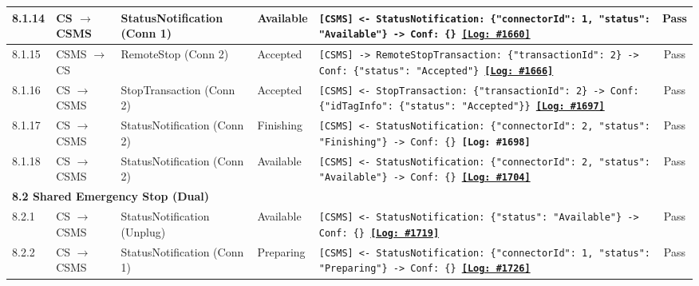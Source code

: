 \documentclass[10pt, a4paper, landscape]{article}
\begin{document}
\begin{longtable}{|p{1.0cm}|p{2.5cm}|p{4.0cm}|p{5.0cm}|p{10.0cm}|c|}
\hline
8.1.14 & CS $\to$ CSMS & StatusNotification (Conn 1) & Available & \footnotesize\texttt{[CSMS] <- StatusNotification: \{"connectorId": 1, "status": "Available"\} \newline [CSMS] -> Conf: \{\} \newline \hyperref[log:8.1.14]{\textbf{[Log: \#1660]}}} & Pass \\
\hline
8.1.15 & CSMS $\to$ CS & RemoteStop (Conn 2) & Accepted & \footnotesize\texttt{[CSMS] -> RemoteStopTransaction: \{"transactionId": 2\} \newline [CS] -> Conf: \{"status": "Accepted"\} \newline \hyperref[log:8.1.15]{\textbf{[Log: \#1666]}}} & Pass \\
\hline
8.1.16 & CS $\to$ CSMS & StopTransaction (Conn 2) & Accepted & \footnotesize\texttt{[CSMS] <- StopTransaction: \{"transactionId": 2\} \newline [CSMS] -> Conf: \{"idTagInfo": \{"status": "Accepted"\}\} \newline \hyperref[log:8.1.16]{\textbf{[Log: \#1697]}}} & Pass \\
\hline
8.1.17 & CS $\to$ CSMS & StatusNotification (Conn 2) & Finishing & \footnotesize\texttt{[CSMS] <- StatusNotification: \{"connectorId": 2, "status": "Finishing"\} \newline [CSMS] -> Conf: \{\} \newline \textbf{[Log: \#1698]}} & Pass \\
\hline
8.1.18 & CS $\to$ CSMS & StatusNotification (Conn 2) & Available & \footnotesize\texttt{[CSMS] <- StatusNotification: \{"connectorId": 2, "status": "Available"\} \newline [CSMS] -> Conf: \{\} \newline \hyperref[log:8.1.18]{\textbf{[Log: \#1704]}}} & Pass \\
\hline
\multicolumn{6}{|l|}{\textbf{8.2 Shared Emergency Stop (Dual)}} \\
\hline
8.2.1 & CS $\to$ CSMS & StatusNotification (Unplug) & Available & \footnotesize\texttt{[CSMS] <- StatusNotification: \{"status": "Available"\} \newline [CSMS] -> Conf: \{\} \newline \hyperref[log:8.2.1]{\textbf{[Log: \#1719]}}} & Pass \\
\hline
8.2.2 & CS $\to$ CSMS & StatusNotification (Conn 1) & Preparing & \footnotesize\texttt{[CSMS] <- StatusNotification: \{"connectorId": 1, "status": "Preparing"\} \newline [CSMS] -> Conf: \{\} \newline \hyperref[log:8.2.2]{\textbf{[Log: \#1726]}}} & Pass \\

\end{longtable}
\end{document}
